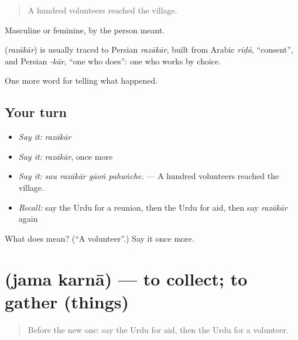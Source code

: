 \begin{quote}
A hundred volunteers reached the village.
\end{quote}

Masculine or feminine, by the person meant.

\begin{cousinweb}
\textbf{} (\emph{razākār}) is usually traced to Persian \emph{razākār}, built from Arabic \emph{riḍā}, \textquotedblleft{}consent\textquotedblright{}, and Persian \emph{-kār}, \textquotedblleft{}one who does\textquotedblright{}: one who works by choice.
\end{cousinweb}

\begin{grammarlens}[title={What you've built}]
One more word for telling what happened.
\end{grammarlens}

\subsection*{Your turn}
\begin{itemize}
\raggedright
  \item \emph{Say it:} \emph{razākār}
  \item \emph{Say it:} \emph{razākār}, once more
  \item \emph{Say it:} \emph{sau razākār gāoṅ pahuṅche.} — A hundred volunteers reached the village.
  \item \emph{Recall:} say the Urdu for a reunion, then the Urdu for aid, then say \emph{razākār} again
\end{itemize}

\begin{tcolorbox}[breakable,colback=teal!4,colframe=teal!35!black,title={Before you move on}]
What does  mean? (\textquotedblleft{}A volunteer\textquotedblright{}.) Say it once more.
\end{tcolorbox}
\section[\texorpdfstring{\ur{جمع} \ur{کرنا} (jama karnā)}{جمع کرنا (jama karnā)}]{  (jama karnā) — to collect; to gather (things)}

\label{lesson:UR-C299-jama-karna}



\begin{quote}
Before the new one: say the Urdu for aid, then the Urdu for a volunteer.
\end{quote}

